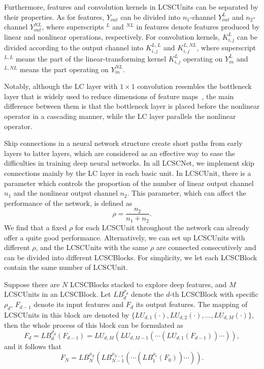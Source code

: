 \documentclass[journal]{IEEEtran}
\begin{document}
Furthermore, features and convolution kernels in LCSCUnits can be separated by their properties. As for features, $Y_{out}$ can be divided into $n_1$-channel $Y_{out}^{L}$ and $n_2$-channel $Y_{out}^{NL}$, where superscripts $^{L}$ and $^{NL}$ in features denote features produced by linear and nonlinear operations, respectively. For convolution kernels, $K_{i,j}^{L}$ can be divided according to the output channel into $K_{i,j}^{L,L}$ and $K_{i,j}^{L,NL}$, where superscript ${}^{L,L}$ means the part of the linear-transforming kernel $K_{i,j}^{L}$ operating on $Y_{in}^{L}$ and ${}^{L,NL}$ means the part operating on $Y_{in}^{NL}$. 

Notably, although the LC layer with $1\times 1$ convolution resembles the bottleneck layer that is widely used to reduce dimensions of feature maps~\cite{lin2013network,huang2017densely}, the main difference between them is that the bottleneck layer is placed before the nonlinear operator in a cascading manner, while the LC layer parallels the nonlinear operator.

Skip connections in a neural network structure create short paths from early layers to latter layers, which are considered as an effective way to ease the difficulties in training deep neural networks. In all LCSCNet, we implement skip connections mainly by the LC layer in each basic unit. In LCSCUnit, there is a parameter which controls the proportion of the number of linear output channel $n_{1}$ and the nonlinear output channel $n_{2}$. This parameter, which can affect the performance of the network, is defined as
\begin{equation}
\rho=\frac{n_{2}}{n_{1} + n_{2}}.
\end{equation}
We find that a fixed $\rho$ for each LCSCUnit throughout the network can already offer a quite good performance. Alternatively, we can set up LCSCUnits with different $\rho$, and the LCSCUnits with the same $\rho$ are connected consecutively and can be divided into different LCSCBlocks. For simplicity, we let each LCSCBlock contain the same number of LCSCUnit.

 

Suppose there are $N$ LCSCBlocks stacked to explore deep features, and $M$ LCSCUnits in an LCSCBlock. Let $LB_{d}^{\rho_{d}}$ denote the $d$-th LCSCBlock with specific $\rho_{d}$, $F_{d-1}$ denote its input features and $F_{d}$ its output features. The mapping of LCSCUnits in this block are denoted by $\{LU_{d,1}(\cdot), LU_{d,2}(\cdot), \dots, LU_{d,M}(\cdot)\}$, then the whole process of this block can be formulated as 
\begin{equation}
F_{d}\!=\!LB_{d}^{\rho_{d}}(F_{d\!-\!1})\!=\!LU_{d,M}(LU_{d,M\!-\!1}(\cdots(LU_{d,1}(F_{d\!-\!1}))\cdots)),
\label{con:over_2}
\end{equation}
and it follows that
\begin{equation}
F_{N} = LB^{\rho_{N}}_{N}(LB^{\rho_{N-1}}_{N-1}(\cdots(LB^{\rho_{1}}_{1}(F_{0}))\cdots)).
\label{con:dfe_1}
\end{equation}
\end{document}
